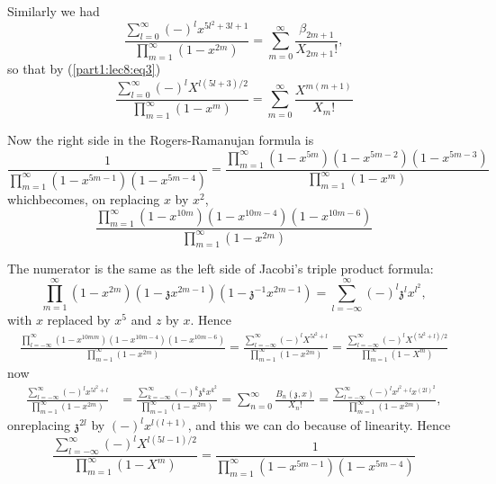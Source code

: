 Similarly we had 
\begin{equation*}
  \frac{\sum\limits^\infty_{l=0} (-)^{l} x^{5l^2
      +3l+1}}{\prod\limits^\infty_{m=1} (1-x^{2m})} = \sum^\infty_{m=0}
  \frac{\beta_{2m+1}}{X_{2m+1}!}, 
\end{equation*}
so that by (\ref{part1:lec8:eq3})
\begin{equation*}
  \frac{\sum\limits^\infty_{l=0} (-)^{l} X^{l(5l
      +3)/2}}{\prod\limits^\infty_{m=1} (1-x^{m})} = \sum^\infty_{m=0}
  \frac{X^{m(m+1)}}{X_m!} \tag{5}\label{part1:lec8:eq5}
\end{equation*}

Now the right side in the Rogers-Ramanujan formula is 
$$
\frac{1}{\prod\limits^\infty_{m=1} (1-x^{5m-1})(1-x^{5m-4})}=
\frac{\prod\limits^\infty_{m=1}
  (1-x^{5m})(1-x^{5m-2})(1-x^{5m-3})}{\prod\limits^\infty_{m=1} (1-x^m)}
$$
which\pageoriginale becomes, on replacing $x$ by $x^2$,
$$
\frac{\prod\limits^\infty_{m=1} (1-x^{10m})(1-x^{10m-4})(1-x^{10m-6})}
{\prod\limits^\infty_{m=1}(1-x^{2m})}
$$

The numerator is the same as the left side of Jacobi's triple product
formula: 
$$
\prod^\infty_{m=1}
(1-x^{2m})(1-\mathfrak{z}x^{2m-1})(1-\mathfrak{z}^{-1}x^{2m-1})=
\sum^\infty_{l=-\infty} (-)^l \mathfrak{z}^l x^{l^2},
$$
with $x$ replaced by $x^5$ and $z$ by $x$. Hence
\begin{align*}
  \frac{\prod\limits^\infty_{l=-\infty} (1-x^{10mm})
    (1-x^{10m-4})(1-x^{10m-6})}{\prod\limits^\infty_{m=1} (1-x^{2m})} =
  \frac{\sum\limits^\infty_{l=-\infty}(-)^l X^{5l^2
      +l}}{\prod\limits^\infty_{m=1} (1-x^{2m})} =
  \frac{\sum\limits^\infty_{l=-\infty} (-)^l X^{(5l^2 +
      l)/2}}{\prod\limits^\infty_{m=1} (1-X^m)}  
\end{align*}
now
\begin{align*}
  \frac{\sum\limits^\infty_{l=-\infty} (-)^l x^{5l^2 +
      l}}{\prod\limits^\infty_{m=1} (1-x^{2m})}& = 
  \frac{\sum\limits^\infty_{k=-\infty} (-)^k \mathfrak{z}^k x^{k^2}}
      {\prod\limits^\infty_{m=1} (1-x^{2m})}
       =\sum^\infty_{n=0} \frac{B_n(\mathfrak{z}, x)}{X_n!}
       = \frac{\sum\limits^\infty_{l=-\infty} (-)^l x^{l^2+l}
        x^{(2l)^2}}{\prod\limits^\infty_{m=1}(1-x^{2m})},  
\end{align*}
on\pageoriginale replacing $\mathfrak{z}^{2l}$ by $(-)^l x^{l(l+1)}$, and this we
can do because of linearity. Hence
$$
\frac{\sum\limits^\infty_{l=-\infty} (-)^l X^{l
    (5l-1)/2}}{\prod\limits^\infty_{m=1} (1-X^m)}=
\frac{1}{\prod\limits^\infty_{m=1}(1-x^{5m-1}) (1-x^{5m-4})}  
$$

